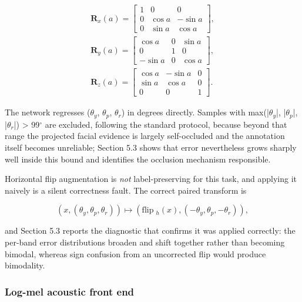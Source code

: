 \begin{equation}
\label{eq:25}
\begin{aligned}
\mathbf{R}_x(a) = \begin{bmatrix} 1 & 0 & 0 \\ 0 & \cos a & -\sin a \\ 0 & \sin a & \cos a \end{bmatrix}, \\
\mathbf{R}_y(a) = \begin{bmatrix} \cos a & 0 & \sin a \\ 0 & 1 & 0 \\ -\sin a & 0 & \cos a \end{bmatrix}, \\
\mathbf{R}_z(a) = \begin{bmatrix} \cos a & -\sin a & 0 \\ \sin a & \cos a & 0 \\ 0 & 0 & 1 \end{bmatrix}.
\end{aligned}
\end{equation}

The network regresses ($\theta_{y}$, $\theta_{p}$, $\theta_{r}$) in degrees directly. Samples with max(|$\theta_{y}$|, |$\theta_{p}$|, |$\theta_{r}$|) > 99$^{\circ}$ are excluded, following the standard protocol, because beyond that range the projected facial evidence is largely self-occluded and the annotation itself becomes unreliable; Section 5.3 shows that error nevertheless grows sharply well inside this bound and identifies the occlusion mechanism responsible.

Horizontal flip augmentation is \emph{not} label-preserving for this task, and applying it naively is a silent correctness fault. The correct paired transform is

\begin{equation}
\label{eq:26}
( x , (\theta _y, \theta _p, \theta _r) ) \mapsto ( \text{flip}\;_h(x) , (-\theta _y, \theta _p, -\theta _r) ),
\end{equation}

and Section 5.3 reports the diagnostic that confirms it was applied correctly: the per-band error distributions broaden and shift together rather than becoming bimodal, whereas sign confusion from an uncorrected flip would produce bimodality.

\subsubsection{Log-mel acoustic front end}

